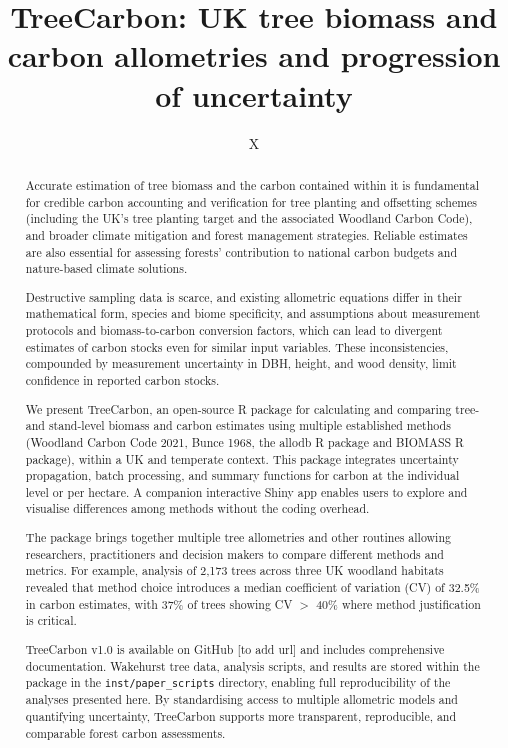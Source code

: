 \documentclass[12pt,a4paper]{article}
\title{TreeCarbon: UK tree biomass and carbon allometries and progression of uncertainty}
\author{X}
\date{}
\begin{document}
\maketitle

\begin{abstract}
Accurate estimation of tree biomass and the carbon contained within it is fundamental for credible carbon accounting and verification for tree planting and offsetting schemes (including the UK's tree planting target and the associated Woodland Carbon Code), and broader climate mitigation and forest management strategies. Reliable estimates are also essential for assessing forests' contribution to national carbon budgets and nature-based climate solutions.

Destructive sampling data is scarce, and existing allometric equations differ in their mathematical form, species and biome specificity, and assumptions about measurement protocols and biomass-to-carbon conversion factors, which can lead to divergent estimates of carbon stocks even for similar input variables. These inconsistencies, compounded by measurement uncertainty in DBH, height, and wood density, limit confidence in reported carbon stocks.

We present TreeCarbon, an open-source R package for calculating and comparing tree- and stand-level biomass and carbon estimates using multiple established methods (Woodland Carbon Code 2021, Bunce 1968, the allodb R package and BIOMASS R package), within a UK and temperate context. This package integrates uncertainty propagation, batch processing, and summary functions for carbon at the individual level or per hectare. A companion interactive Shiny app enables users to explore and visualise differences among methods without the coding overhead.

The package brings together multiple tree allometries and other routines allowing researchers, practitioners and decision makers to compare different methods and metrics. For example, analysis of 2,173 trees across three UK woodland habitats revealed that method choice introduces a median coefficient of variation (CV) of 32.5\% in carbon estimates, with 37\% of trees showing CV $>$ 40\% where method justification is critical.

TreeCarbon v1.0 is available on GitHub [to add url] and includes comprehensive documentation. Wakehurst tree data, analysis scripts, and results are stored within the package in the \texttt{inst/paper\_scripts} directory, enabling full reproducibility of the analyses presented here. By standardising access to multiple allometric models and quantifying uncertainty, TreeCarbon supports more transparent, reproducible, and comparable forest carbon assessments.
\end{abstract}
\end{document}
